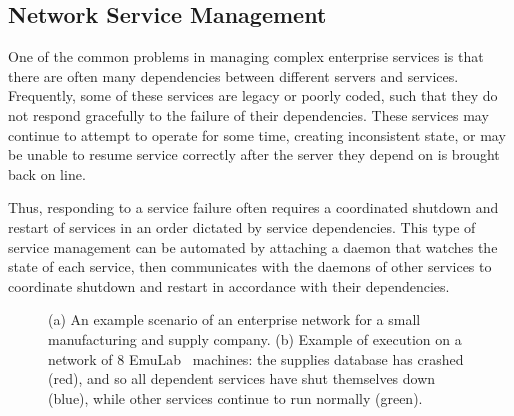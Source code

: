 \documentclass[12pt,a4paper,twoside,openright]{book}
\begin{document}
\subsection{Network Service Management}

One of the common problems in managing complex enterprise services is that there are often many dependencies between different servers and services.
%
Frequently, some of these services are legacy or poorly coded, such that they do not respond gracefully to the failure of their dependencies.  These services may continue to attempt to operate for some time, creating inconsistent state, or may be unable to resume service correctly after the server they depend on is brought back on line.

Thus, responding to a service failure often requires a coordinated shutdown and restart of services in an order dictated by service dependencies.
%
This type of service management can be automated by attaching a daemon that watches the state of each service, then communicates with the daemons of other services to coordinate shutdown and restart in accordance with their dependencies.

\begin{figure}[t!]
\centering
{}
\caption{(a) An example scenario of an enterprise network for a small
manufacturing and supply company. (b) Example of execution on a network of 8
EmuLab~\cite{EmuLab} machines: the supplies database has crashed (red), and so
all dependent services have shut themselves down (blue), while other services
continue to run normally (green).}
\label{f:restart}
\end{figure}
\end{document}
